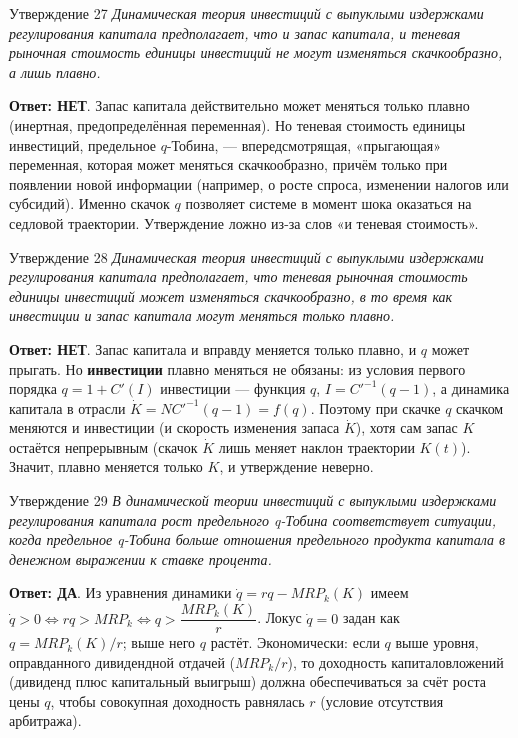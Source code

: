 \documentclass[10pt,a4paper]{article}
\newcommand{\qda}{\textbf{\color{yesgreen}Ответ: ДА}}
\newcommand{\qnet}{\textbf{\color{nored}Ответ: НЕТ}}
\newenvironment{answer}[2]{%
  \begin{qbox}{Утверждение #1}
  \textit{#2}\par\smallskip
}{%
  \end{qbox}\vspace{2pt}
}
\begin{document}
\begin{answer}{27}{Динамическая теория инвестиций с выпуклыми издержками регулирования капитала предполагает, что и запас капитала, и теневая рыночная стоимость единицы инвестиций не могут изменяться скачкообразно, а лишь плавно.}
\qnet. Запас капитала действительно может меняться только плавно (инертная, предопределённая переменная). Но теневая стоимость единицы инвестиций, предельное $q$-Тобина, --- впередсмотрящая, «прыгающая» переменная, которая может меняться скачкообразно, причём только при появлении новой информации (например, о росте спроса, изменении налогов или субсидий). Именно скачок $q$ позволяет системе в момент шока оказаться на седловой траектории. Утверждение ложно из-за слов «и теневая стоимость».
\end{answer}

\begin{answer}{28}{Динамическая теория инвестиций с выпуклыми издержками регулирования капитала предполагает, что теневая рыночная стоимость единицы инвестиций может изменяться скачкообразно, в то время как инвестиции и запас капитала могут меняться только плавно.}
\qnet. Запас капитала и вправду меняется только плавно, и $q$ может прыгать. Но \textbf{инвестиции} плавно меняться не обязаны: из условия первого порядка $q=1+C'(I)$ инвестиции --- функция $q$, $I=C'^{-1}(q-1)$, а динамика капитала в отрасли $\dot K=NC'^{-1}(q-1)=f(q)$. Поэтому при скачке $q$ скачком меняются и инвестиции (и скорость изменения запаса $\dot K$), хотя сам запас $K$ остаётся непрерывным (скачок $\dot K$ лишь меняет наклон траектории $K(t)$). Значит, плавно меняется только $K$, и утверждение неверно.
\end{answer}

\begin{answer}{29}{В динамической теории инвестиций с выпуклыми издержками регулирования капитала рост предельного q-Тобина соответствует ситуации, когда предельное q-Тобина больше отношения предельного продукта капитала в денежном выражении к ставке процента.}
\qda. Из уравнения динамики $\dot q=rq-MRP_k(K)$ имеем $\dot q>0 \Longleftrightarrow rq>MRP_k \Longleftrightarrow q>\dfrac{MRP_k(K)}{r}$. Локус $\dot q=0$ задан как $q=MRP_k(K)/r$; выше него $q$ растёт. Экономически: если $q$ выше уровня, оправданного дивидендной отдачей ($MRP_k/r$), то доходность капиталовложений (дивиденд плюс капитальный выигрыш) должна обеспечиваться за счёт роста цены $q$, чтобы совокупная доходность равнялась $r$ (условие отсутствия арбитража).
\end{answer}
\end{document}

